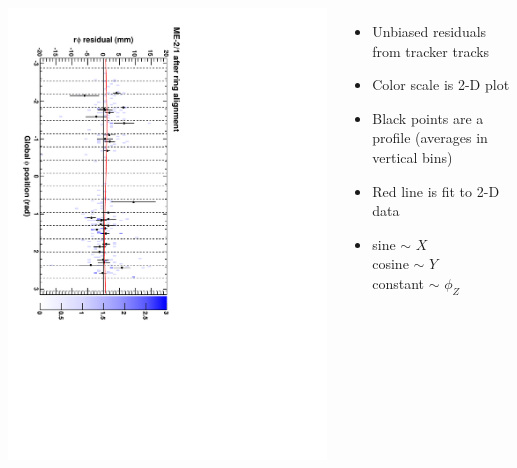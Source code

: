 \documentclass[compress]{beamer}
\begin{document}
\begin{frame}
\begin{columns}
\includegraphics[height=\linewidth, angle=90]{ringfits_after/mem21.pdf}
\begin{itemize}
\item Unbiased residuals from tracker tracks
\item Color scale is 2-D plot
\item Black points are a profile (averages in vertical bins)
\item Red line is fit to 2-D data
\item sine $\sim$ $X$ \\
cosine $\sim$ $Y$ \\
constant $\sim$ $\phi_Z$
\end{itemize}
\end{columns}
\end{frame}
\end{document}
